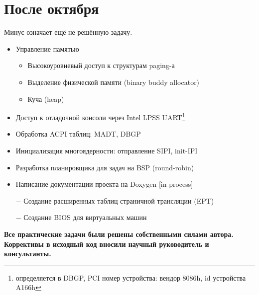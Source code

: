 \documentclass[a4paper,11pt]{extarticle}
\begin{document}
\section{После октября}
	Минус означает ещё не решённую задачу.
\begin{itemize}
	\item Управление памятью
	\renewcommand{\labelitemii}{$\circ$}
	\begin{itemize}
		\item Высокоуровневый доступ к структурам paging-а
		\item Выделение физической памяти (binary buddy allocator)
		\item Куча (heap)
	\end{itemize}
	\item Доступ к отладочной консоли через Intel LPSS UART\footnote{определяется в DBGP, PCI номер устройства: вендор 8086h, id устройства A166h}
	\item Обработка ACPI таблиц: MADT, DBGP
	\item Инициализация многоядерности: отправление SIPI, init-IPI
	\item Разработка планировщика для задач на BSP (round-robin)
	\item Написание документации проекта на Doxygen [in process]
	\item[$-$] Создание расширенных таблиц страничной трансляции (EPT)
	\item[$-$] Создание BIOS для виртуальных машин
\end{itemize}\par
	\textbf{Все практические задачи были решены собственными силами автора. Коррективы в исходный код вносили научный руководитель и консультанты.}
\end{document}
